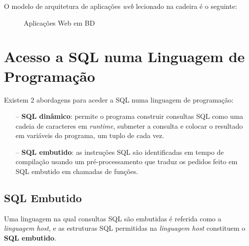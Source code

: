 \documentclass[oneside]{book}
\theoremstyle{definition}
\begin{document}
O modelo de arquitetura de aplicações \textit{web} lecionado na cadeira é o seguinte:
\begin{figure}[H]%
    \centering
    \qquad
    \caption{Aplicações Web em BD}%
    \label{fig:example}%
\end{figure}

\section{Acesso a SQL numa Linguagem de Programação}
Existem 2 abordagens para aceder a SQL numa linguagem de programação:
\begin{itemize}
    \itemsep0cm
    \item[--] \textbf{SQL dinâmico}: permite o programa construir consultas SQL como uma cadeia de caracteres em \textit{runtime}, submeter a consulta e colocar o resultado em variáveis do programa, um tuplo de cada vez.
    \item[--] \textbf{SQL embutido}: as instruções SQL são identificadas em tempo de compilação usando um pré-processamento que traduz os pedidos feito em SQL embutido em chamadas de funções.
\end{itemize}

\subsection{SQL Embutido}
Uma linguagem na qual consultas SQL são embutidas é referida como a \textit{linguagem host}, e as estruturas SQL permitidas na \textit{linguagem host} constituem o \textbf{SQL embutido}.
\end{document}
